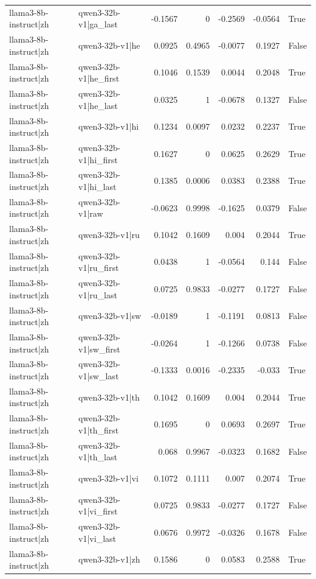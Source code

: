 \begin{table}
\begin{tabular}{l l r r r r l}
llama3-8b-instruct|zh & qwen3-32b-v1|ga_last & -0.1567 & 0 & -0.2569 & -0.0564 & True \\
llama3-8b-instruct|zh & qwen3-32b-v1|he & 0.0925 & 0.4965 & -0.0077 & 0.1927 & False \\
llama3-8b-instruct|zh & qwen3-32b-v1|he_first & 0.1046 & 0.1539 & 0.0044 & 0.2048 & True \\
llama3-8b-instruct|zh & qwen3-32b-v1|he_last & 0.0325 & 1 & -0.0678 & 0.1327 & False \\
llama3-8b-instruct|zh & qwen3-32b-v1|hi & 0.1234 & 0.0097 & 0.0232 & 0.2237 & True \\
llama3-8b-instruct|zh & qwen3-32b-v1|hi_first & 0.1627 & 0 & 0.0625 & 0.2629 & True \\
llama3-8b-instruct|zh & qwen3-32b-v1|hi_last & 0.1385 & 0.0006 & 0.0383 & 0.2388 & True \\
llama3-8b-instruct|zh & qwen3-32b-v1|raw & -0.0623 & 0.9998 & -0.1625 & 0.0379 & False \\
llama3-8b-instruct|zh & qwen3-32b-v1|ru & 0.1042 & 0.1609 & 0.004 & 0.2044 & True \\
llama3-8b-instruct|zh & qwen3-32b-v1|ru_first & 0.0438 & 1 & -0.0564 & 0.144 & False \\
llama3-8b-instruct|zh & qwen3-32b-v1|ru_last & 0.0725 & 0.9833 & -0.0277 & 0.1727 & False \\
llama3-8b-instruct|zh & qwen3-32b-v1|sw & -0.0189 & 1 & -0.1191 & 0.0813 & False \\
llama3-8b-instruct|zh & qwen3-32b-v1|sw_first & -0.0264 & 1 & -0.1266 & 0.0738 & False \\
llama3-8b-instruct|zh & qwen3-32b-v1|sw_last & -0.1333 & 0.0016 & -0.2335 & -0.033 & True \\
llama3-8b-instruct|zh & qwen3-32b-v1|th & 0.1042 & 0.1609 & 0.004 & 0.2044 & True \\
llama3-8b-instruct|zh & qwen3-32b-v1|th_first & 0.1695 & 0 & 0.0693 & 0.2697 & True \\
llama3-8b-instruct|zh & qwen3-32b-v1|th_last & 0.068 & 0.9967 & -0.0323 & 0.1682 & False \\
llama3-8b-instruct|zh & qwen3-32b-v1|vi & 0.1072 & 0.1111 & 0.007 & 0.2074 & True \\
llama3-8b-instruct|zh & qwen3-32b-v1|vi_first & 0.0725 & 0.9833 & -0.0277 & 0.1727 & False \\
llama3-8b-instruct|zh & qwen3-32b-v1|vi_last & 0.0676 & 0.9972 & -0.0326 & 0.1678 & False \\
llama3-8b-instruct|zh & qwen3-32b-v1|zh & 0.1586 & 0 & 0.0583 & 0.2588 & True \\

\end{tabular}
\end{table}
